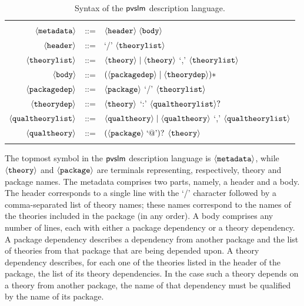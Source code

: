 \begin{table}
  \centering
  \begin{tabular}{r c p{8cm}}
    \hline \\
    $\langle{\texttt{metadata}}\rangle$ & ::= & $\langle{\texttt{header}}\rangle \; \langle{\texttt{body}}\rangle$ \\
    $\langle{\texttt{header}}\rangle$ & ::= & `/' $\langle{\texttt{theorylist}}\rangle$ \\
    $\langle{\texttt{theorylist}}\rangle$ & ::= & $\langle{\texttt{theory}}\rangle \mid \langle{\texttt{theory}}\rangle$ `,' $\langle{\texttt{theorylist}}\rangle$ \\
    $\langle{\texttt{body}}\rangle$ & ::= & $(\langle{\texttt{packagedep}}\rangle \mid \langle{\texttt{theorydep}}\rangle)*$ \\
    $\langle{\texttt{packagedep}}\rangle$ & ::= & $\langle{\texttt{package}}\rangle$ `/' $\langle{\texttt{theorylist}}\rangle$ \\
    $\langle{\texttt{theorydep}}\rangle$ & ::= & $\langle{\texttt{theory}}\rangle$ `:' $\langle{\texttt{qualtheorylist}}\rangle ?$ \\
    $\langle{\texttt{qualtheorylist}}\rangle$ & ::= & $\langle{\texttt{qualtheory}}\rangle \mid \langle{\texttt{qualtheory}}\rangle$ `,' $\langle{\texttt{qualtheorylist}}\rangle$ \\
    $\langle{\texttt{qualtheory}}\rangle$ & ::= & $(\langle{\texttt{package}}\rangle\; \text{`@'})?$ $\langle{\texttt{theory}}\rangle$ \\
    \\
    \hline
  \end{tabular}
  \caption{Syntax of the $\textsf{pvslm}$ description language.}
  \label{tab.bnf}
\end{table}

The topmost symbol in the $\textsf{pvslm}$ description language is
$\langle{\texttt{metadata}}\rangle$, while $\langle{\texttt{theory}}\rangle$ and
$\langle{\texttt{package}}\rangle$ are terminals representing, respectively,
theory and package names. The metadata comprises two parts, namely, a
header and a body. The header corresponds to a single line with the
`/' character followed by a comma-separated list of theory names;
these names correspond to the names of the theories included in the
package (in any order). A body comprises any number of lines, each
with either a package dependency or a theory dependency. A package
dependency describes a dependency from another package and the list of
theories from that package that are being depended upon. A theory
dependency describes, for each one of the theories listed in the
header of the package, the list of its theory dependencies. In the
case such a theory depends on a theory from another package, the name
of that dependency must be qualified by the name of its package.

